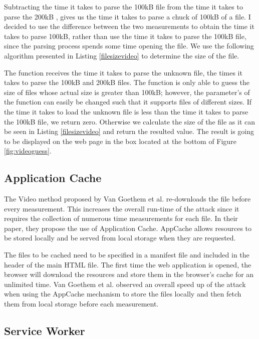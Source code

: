 \documentclass[10pt,a4paper,twoside]{book}
\begin{document}
Subtracting the time it takes to parse the 100kB file  from the time it takes to parse the 200kB , gives us the time it takes to parse a chuck of 100kB of a file. I decided to use the difference between the two measurements to obtain the time it takes to parse 100kB, rather than use the time it takes to parse the 100kB file, since the parsing process spends some time opening the file. We use the following algorithm presented in Listing \ref{filesizevideo} to determine the size of the file.

The function receives the time it takes to parse the unknown file, the times it takes to parse the 100kB and 200kB files. The function is only able to guess the size of files whose actual size is greater than 100kB; however, the parameter's of the function can easily be changed such that it supports files of different sizes. If the time it takes to load the unknown file is less than the time it takes to parse the 100kB file, we return zero. Otherwise we calculate the size of the file as it can be seen in Listing \ref{filesizevideo} and return the resulted value. The result is going to be displayed on the web page in the box located at the bottom of Figure \ref{fig:videoguess}.

\subsection{Application Cache}

The Video method proposed by Van Goethem et al. \cite{van2015clock} re-downloads the file before every measurement. This increases the overall run-time of the attack since it requires the collection of numerous time measurements for each file. In their paper, they propose the use of Application Cache. AppCache allows resources to be stored locally and be served from local storage when they are requested. 

The files to be cached need to be specified in a manifest file and included in the header of the main HTML file. The first time the web application is opened, the browser will download the resources and store them in the browser's cache for an unlimited time. Van Goethem et al. \cite{van2015clock} observed an overall speed up of the attack when using the AppCache mechanism to store the files locally and then fetch them from local storage before each measurement.

\subsection{Service Worker}
\label{webSW}
\end{document}

